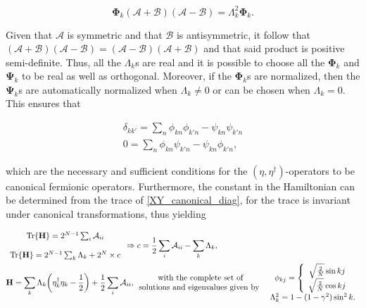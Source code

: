 \documentclass{homework}
\begin{document}
\begin{equation}
    \bm{\Phi}_{k} (\bm{\mathcal{A}} + \bm{\mathcal{B}}) (\bm{\mathcal{A}} - \bm{\mathcal{B}}) = \Lambda_k^2 \bm{\Phi}_{k}.
\end{equation}

Given that $\bm{\mathcal{A}}$ is symmetric and that 
$\bm{\mathcal{B}}$ is antisymmetric, it follow that $(\bm{\mathcal{A}} + \bm{\mathcal{B}}) (\bm{\mathcal{A}} - \bm{\mathcal{B}}) = (\bm{\mathcal{A}} - \bm{\mathcal{B}}) (\bm{\mathcal{A}} + \bm{\mathcal{B}})$ and that said product is positive semi-definite. Thus, all the $\Lambda_k$s are real and it is possible to choose all the $\bm{\Phi}_{k}$ and $\bm{\Psi}_{k}$ to be real as well as orthogonal. Moreover, if the $\bm{\Phi}_{k}$s are normalized, then the $\bm{\Psi}_{k}$s are automatically normalized when $\Lambda_k \neq 0$ or can be chosen when $\Lambda_k = 0$. This ensures that 

\begin{equation}
    \begin{array}{c}
         \delta_{kk'} = \sum_{n} \phi_{k n} \phi_{k' n} - \psi_{kn} \psi_{k'n} \\
         0 = \sum_{n} \phi_{k n} \psi_{k' n} - \psi_{kn} \phi_{k'n},
    \end{array}
\end{equation}

which are the necessary and sufficient conditions for the $(\eta, \eta^\dagger)$-operators to be canonical fermionic operators. Furthermore, the constant in the Hamiltonian can be determined from the trace of \cref{XY_canonical_diag}, for the trace is invariant under canonical transformations, thus yielding 

\begin{equation}
\begin{split}
    &\begin{array}{c}
         \Tr {\bf H} = 2^{N-1} \sum_{i} \mathcal{A}_{ii}  \\ \\
         \Tr {\bf H} = 2^{N-1} \sum_{k} \Lambda_k + 2^N \times c
    \end{array} \Rightarrow c = \frac{1}{2} \sum_{i} \mathcal{A}_{ii} - \sum_{k} \Lambda_k,\\
    & {\bf H} ={\sum_{k} \Lambda_k \bigg(\eta_k^\dagger \eta_k - \frac{1}{2} \bigg) + \frac{1}{2} \sum_{i} \mathcal{A}_{ii}}, \begin{array}{c}
         \textnormal{ with the complete set of  }  \\
         \textnormal{solutions and eigenvalues given by }
    \end{array} \begin{array}{cc}
       \phi_{kj} = \left\{\begin{array}{c}
         \sqrt{\frac{2}{N}} \sin kj  \\
         \sqrt{\frac{2}{N}} \cos kj \\
    \end{array} \right. \\ 
       \Lambda_k^2 =  1 - (1-\gamma^2) \sin^2 k.
    \end{array}
\end{split} 
\end{equation}
\end{document}
